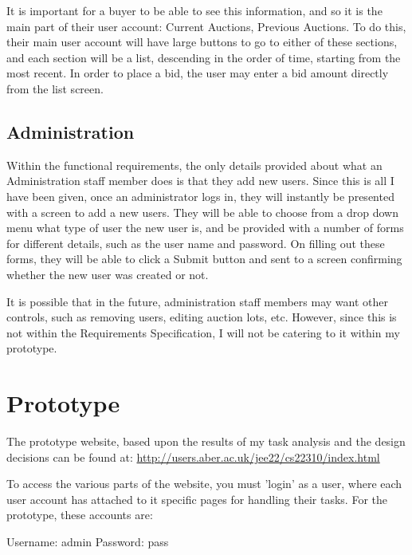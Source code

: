\documentclass{article}
\begin{document}
It is important for a buyer to be able to see this information, and so it is the main part of their user account: Current Auctions, Previous Auctions. To do this, their main user account will have large buttons to go to either of these sections, and each section will be a list, descending in the order of time, starting from the most recent. In order to place a bid, the user may enter a bid amount directly from the list screen.

\subsection{Administration}

Within the functional requirements, the only details provided about what an Administration staff member does is that they add new users. Since this is all I have been given, once an administrator logs in, they will instantly be presented with a screen to add a new users. They will be able to choose from a drop down menu what type of user the new user is, and be provided with a number of forms for different details, such as the user name and password. On filling out these forms, they will be able to click a Submit button and sent to a screen confirming whether the new user was created or not.

It is possible that in the future, administration staff members may want other controls, such as removing users, editing auction lots, etc. However, since this is not within the Requirements Specification, I will not be catering to it within my prototype.


\section{Prototype}

The prototype website, based upon the results of my task analysis and the design decisions can be found at: 
\url{http://users.aber.ac.uk/jee22/cs22310/index.html}

To access the various parts of the website, you must 'login' as a user, where each user account has attached to it specific pages for handling their tasks. For the prototype, these accounts are:

Username: admin
Password: pass
\end{document}

